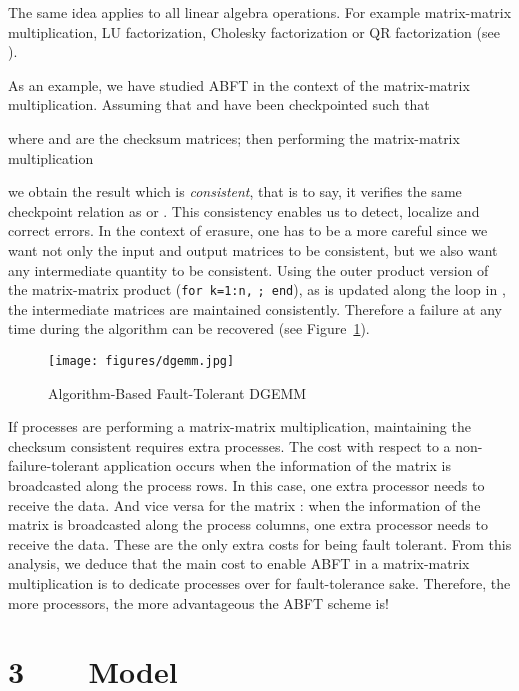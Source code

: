 \documentclass[pdftex,11pt]{article}
\begin{document}
The same idea applies to all linear algebra operations. For example
matrix-matrix multiplication, LU factorization, Cholesky factorization
or QR factorization (see
\cite{BaAb:86,Bane:90,HuAb:84,LuPa:88,RoBa:94}).

As an example, we have studied ABFT in the context of the
matrix-matrix multiplication.  Assuming that  and  have been
checkpointed such that

where  and  are the checksum matrices; then performing the
matrix-matrix multiplication

we obtain the result  which is \textit{consistent}, that is to
say, it verifies the same checkpoint relation as  or . This
consistency enables us to detect, localize and correct errors.  In the
context of erasure, one has to be a more careful since we want not
only the input and output matrices to be consistent, but we also want
any intermediate quantity to be consistent. Using the outer product
version of the matrix-matrix product (\texttt{for k=1:n,}  \texttt{; end}), as  is updated along the loop in
, the intermediate  matrices are maintained
consistently. Therefore a failure at any time during the algorithm can
be recovered (see Figure~\ref{fig:dgemm}).
 
\begin{figure}[!h]
\color{DodgerBlue4}
\begin{center}
\texttt{[image: figures/dgemm.jpg]}
\end{center}
\caption{\label{fig:dgemm}
\color{black}
Algorithm-Based Fault-Tolerant DGEMM
}
\end{figure}

If  processes are performing a matrix-matrix multiplication,
maintaining the checksum consistent requires  extra processes.
The cost with respect to a non-failure-tolerant application occurs
when the information of the matrix  is broadcasted along the
process rows. In this case, one extra processor needs to receive the
data. And vice versa for the matrix : when the information of the
matrix  is broadcasted along the process columns, one extra
processor needs to receive the data. These are the only extra costs
for being fault tolerant.
From this analysis, we deduce that the main cost to enable ABFT in a
matrix-matrix multiplication is to dedicate  processes over
 for fault-tolerance sake. Therefore, the more processors, the
more advantageous the ABFT scheme is!


\section*{\color{DodgerBlue4}3~~~~Model}
\end{document}
